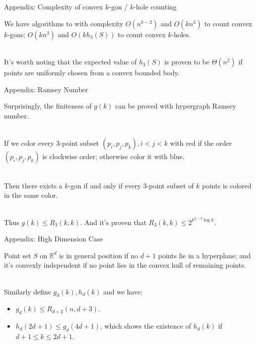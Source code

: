 \documentclass{beamer}
\begin{document}
\begin{frame}{Appendix: Complexity of convex $k$-gon / $k$-hole counting}

We have algorithms to with complexity $O(n^{k-2})$ and $O(kn^3)$ to count convex $k$-gons; $O(kn^3)$ and $O(kh_3(S))$ to count convex $k$-holes. \\~\ 

It's worth noting that the expected value of $h_3(S)$ is proven to be $\Theta(n^2)$ if points are uniformly chosen from a convex bounded body.
    
\end{frame}

\begin{frame}{Appendix: Ramsey Number}

Surprisingly, the finiteness of $g(k)$ can be proved with hypergraph Ramsey number. \\~\

If we color every 3-point subset $(p_i, p_j, p_k), i < j  < k$ with red if the order $(p_i, p_j, p_k)$ is clockwise order; otherwise color it with blue. \\~\

Then there exists a $k$-gon if and only if every 3-point subset of $k$ points is colored in the same color. \\~\

Thus $g(k) \le R_3(k ,k)$. And it's proven that $R_3(k, k) \le 2^{k^{k-2}\log k}$.

\end{frame}

\begin{frame}{Appendix: High Dimension Case}

Point set $S$ on $\mathbb{R}^d$ is in general  position if no $d+1$ points lie in a hyperplane; and it's convexly independent if no point lies in the convex hull of remaining points. \\~\

Similarly define $g_d(k), h_d(k)$ and we have:

\begin{itemize}
    \item 
$g_d(k) \le R_{d+2}(n, d+3)$.
    \item 
$h_d(2d+1) \le g_d(4d+1)$, which shows the existence of $h_d(k)$ if $d + 1 \le k \le 2d + 1$.
    
\end{itemize}


\end{frame}

\end{document}
